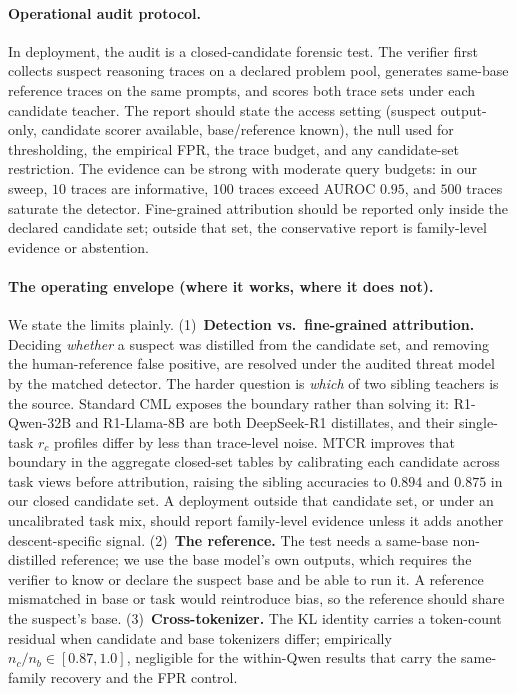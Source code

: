 \documentclass[journal]{IEEEtran}
\begin{document}
\paragraph{Operational audit protocol.}
In deployment, the audit is a closed-candidate forensic test. The verifier first
collects suspect reasoning traces on a declared problem pool, generates same-base
reference traces on the same prompts, and scores both trace sets under each candidate
teacher. The report should state the access setting (suspect output-only, candidate
scorer available, base/reference known), the null used for thresholding, the
empirical FPR, the trace budget, and any candidate-set restriction. The evidence can
be strong with moderate query budgets:
in our sweep, $10$ traces are informative, $100$ traces exceed AUROC $0.95$, and
$500$ traces saturate the detector. Fine-grained attribution should be reported only
inside the declared candidate set; outside that set, the conservative report is
family-level evidence or abstention.

\paragraph{The operating envelope (where it works, where it does not).}
We state the limits plainly. (1)~\textbf{Detection vs.\ fine-grained attribution.}
Deciding \emph{whether} a suspect was distilled from the candidate set, and removing
the human-reference false positive, are resolved under the audited threat model by
the matched detector. The harder
question is \emph{which} of two sibling teachers is the source. Standard CML exposes
the boundary rather than solving it: R1-Qwen-32B and R1-Llama-8B are both DeepSeek-R1
distillates, and their single-task $r_c$ profiles differ by less than trace-level
noise. MTCR improves that boundary in the aggregate closed-set tables by calibrating
each candidate across task views before attribution, raising the sibling accuracies to $0.894$ and $0.875$ in
our closed candidate set. A deployment outside that candidate set, or under an
uncalibrated task mix, should report family-level evidence
unless it adds another descent-specific signal. (2)~\textbf{The reference.} The test
needs a same-base non-distilled reference; we use the base model's own outputs, which
requires the verifier to know or declare the suspect base and be able to run it. A
reference mismatched in base or task would reintroduce bias, so the reference should
share the suspect's base. (3)~\textbf{Cross-tokenizer.} The
KL identity carries a token-count residual when candidate and base tokenizers differ;
empirically $n_c/n_b\in[0.87,1.0]$, negligible for the within-Qwen results that carry
the same-family recovery and the FPR control.
\end{document}
